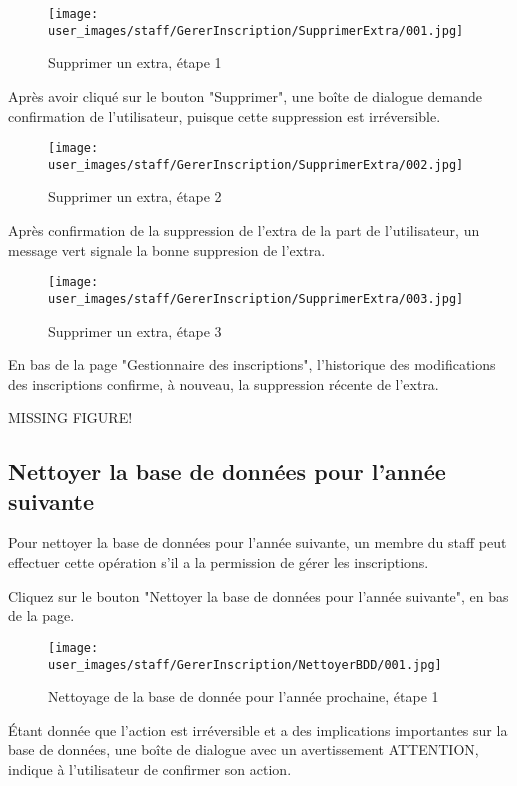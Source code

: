 \begin{figure}[H]
\centering
\texttt{[image: user\_images/staff/GererInscription/SupprimerExtra/001.jpg]}
\caption{Supprimer un extra, étape 1}
\end{figure}

Après avoir cliqué sur le bouton "Supprimer", une boîte de dialogue demande confirmation de l'utilisateur, puisque cette suppression est irréversible.

\begin{figure}[H]
\centering
\texttt{[image: user\_images/staff/GererInscription/SupprimerExtra/002.jpg]}
\caption{Supprimer un extra, étape 2}
\end{figure}

Après confirmation de la suppression de l'extra de la part de l'utilisateur, un message vert signale la bonne suppresion de l'extra.

\begin{figure}[H]
\centering
\texttt{[image: user\_images/staff/GererInscription/SupprimerExtra/003.jpg]}
\caption{Supprimer un extra, étape 3}
\end{figure}

En bas de la page "Gestionnaire des inscriptions", l'historique des modifications des inscriptions confirme, à nouveau, la suppression récente de l'extra.

MISSING FIGURE!

\subsection{Nettoyer la base de données pour l'année suivante}

Pour nettoyer la base de données pour l'année suivante, un membre du staff peut effectuer cette opération s'il a la permission de gérer les inscriptions.\newline

Cliquez sur le bouton "Nettoyer la base de données pour l'année suivante", en bas de la page.

\begin{figure}[H]
\centering
\texttt{[image: user\_images/staff/GererInscription/NettoyerBDD/001.jpg]}
\caption{Nettoyage de la base de donnée pour l'année prochaine, étape 1}
\end{figure}

Étant donnée que l'action est irréversible et a des implications importantes sur la base de données, une boîte de dialogue avec un avertissement ATTENTION, indique à l'utilisateur de confirmer son action.

